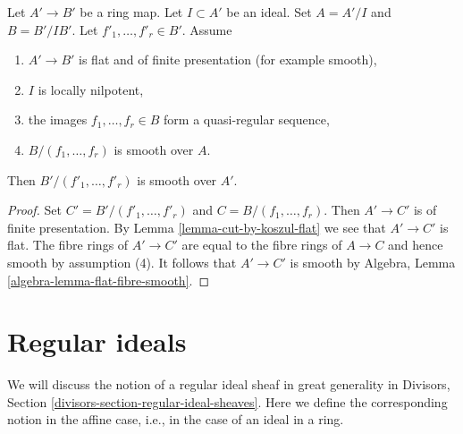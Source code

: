 \begin{lemma}
\label{lemma-cut-by-koszul}
Let $A' \to B'$ be a ring map. Let $I \subset A'$ be an ideal.
Set $A = A'/I$ and $B = B'/IB'$. Let $f'_1, \ldots, f'_r \in B'$. Assume
\begin{enumerate}
\item $A' \to B'$ is flat and of finite presentation (for example smooth),
\item $I$ is locally nilpotent,
\item the images $f_1, \ldots, f_r \in B$ form a quasi-regular sequence,
\item $B/(f_1, \ldots, f_r)$ is smooth over $A$.
\end{enumerate}
Then $B'/(f'_1, \ldots, f'_r)$ is smooth over $A'$.
\end{lemma}

\begin{proof}
Set $C' = B'/(f'_1, \ldots, f'_r)$ and $C = B/(f_1, \ldots, f_r)$.
Then $A' \to C'$ is of finite presentation.
By Lemma \ref{lemma-cut-by-koszul-flat} we see that $A' \to C'$ is flat.
The fibre rings of $A' \to C'$ are equal to the fibre rings of $A \to C$
and hence smooth by assumption (4). It follows that
$A' \to C'$ is smooth by
Algebra, Lemma \ref{algebra-lemma-flat-fibre-smooth}.
\end{proof}








\section{Regular ideals}
\label{section-ideals}

\noindent
We will discuss the notion of a regular ideal sheaf in great generality in
Divisors, Section \ref{divisors-section-regular-ideal-sheaves}.
Here we define the corresponding notion in the affine case, i.e., in
the case of an ideal in a ring.

